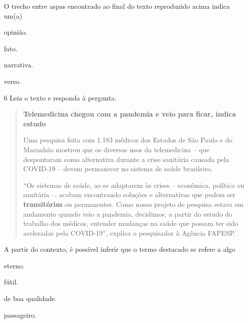 O trecho entre aspas encontrado ao final do texto reproduzido acima
indica um(a)

\begin{escolha}
  \item opinião.

  \item fato.

  \item narrativa.

  \item verso.
\end{escolha}

\num{6} Leia o texto e responda à pergunta.

\begin{quote}
\textbf{Telemedicina chegou com a pandemia e veio para ficar, indica estudo}

Uma pesquisa feita com 1.183 médicos dos Estados de São Paulo e do
Maranhão mostrou que os diversos usos da telemedicina -- que despontaram
como alternativa durante a crise sanitária causada pela COVID-19 --
devem permanecer no sistema de saúde brasileiro.

``Os sistemas de saúde, ao se adaptarem às crises -- econômica, política
ou sanitária --, acabam encontrando soluções e alternativas que podem
ser \textbf{transitórias} ou permanentes. Como nosso projeto de pesquisa
estava em andamento quando veio a pandemia, decidimos, a partir do
estudo do trabalho dos médicos, entender mudanças na saúde que possam
ter sido aceleradas pela COVID-19'', explica o pesquisador à Agência
FAPESP.
\end{quote}


A partir do contexto, é possível inferir que o termo destacado se
refere a algo

\begin{escolha}
  \item eterno.

  \item fútil.

  \item de boa qualidade.

  \item passageiro.
\end{escolha}


